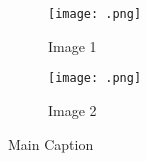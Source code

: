 \documentclass{article}
\begin{document}
	\begin{figure}[h!]
		\centering
		\begin{subfigure}[b]{0.4\linewidth}
			\texttt{[image: .png]}
			\caption{Image 1}
		\end{subfigure}
		\hspace{0.1\linewidth}
		\begin{subfigure}[b]{0.4\linewidth}
			\texttt{[image: .png]}
			\caption{Image 2}
		\end{subfigure}
		\caption{Main Caption}
	\end{figure}
\end{document}
